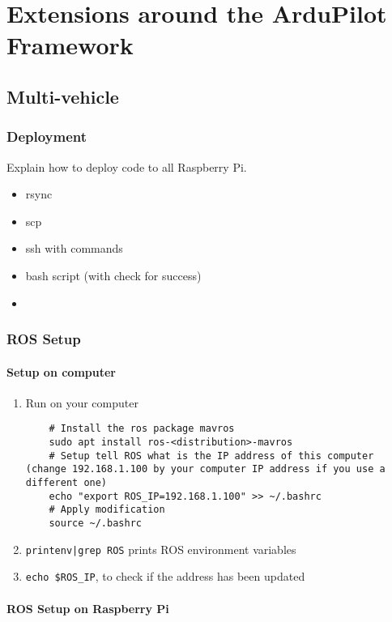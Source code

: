 \chapter{Extensions around the ArduPilot Framework}

\section{Multi-vehicle}

\subsection{Deployment}
Explain how to deploy code to all Raspberry Pi.
\begin{itemize}
    \item rsync
    \item scp
    \item ssh with commands
    \item bash script (with check for success)
    \item
\end{itemize}

\subsection{ROS Setup}
\subsubsection{Setup on computer}
\begin{enumerate}
    \item Run on your computer

          \begin{verbatim}
    # Install the ros package mavros
    sudo apt install ros-<distribution>-mavros
    # Setup tell ROS what is the IP address of this computer (change 192.168.1.100 by your computer IP address if you use a different one)
    echo "export ROS_IP=192.168.1.100" >> ~/.bashrc
    # Apply modification
    source ~/.bashrc
                    \end{verbatim}
    \item \texttt{printenv|grep ROS} prints ROS environment variables
    \item \texttt{echo \$ROS\_IP}, to check if the address has been updated
\end{enumerate}

\subsubsection{ROS Setup on Raspberry Pi}

